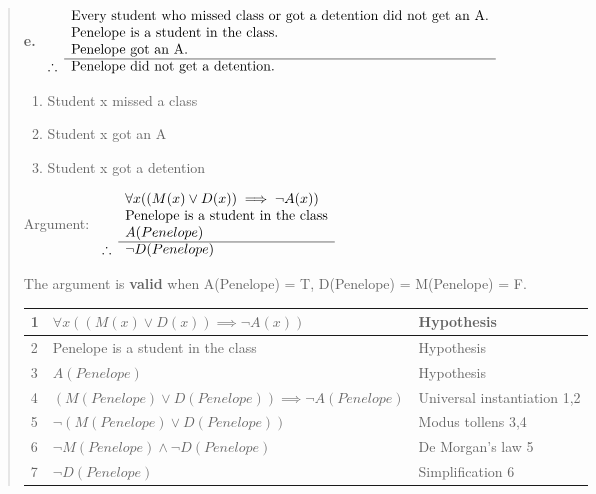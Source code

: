 \documentclass[11pt, oneside]{article}
\begin{document}
\begin{quote}
    \textbf{e. }
    \(
    \begin{array}{rl}
      & \textnormal{Every student who missed class or got a detention did not get an A.} \\
      & \textnormal{Penelope is a student in the class.} \\
      & \textnormal{Penelope got an A.} \\
      \cline{2-2}
    \therefore & \textnormal{Penelope did not get a detention.} 
    \end{array}
    \)  
    
    \begin{enumerate}
        \item[M(x):] Student x missed a class
        \item[A(x):] Student x got an A
        \item[D(x):] Student x got a detention
    \end{enumerate}
    
    Argument:
    \(
    \begin{array}{rl}
      & \forall x ((M(x) \lor D(x)) \implies \neg A(x)) \\
      & \textnormal{Penelope is a student in the class} \\
      & A(Penelope) \\
      \cline{2-2}
    \therefore & \neg D(Penelope) 
    \end{array}
    \)
    
    The argument is \textbf{valid} when A(Penelope) = T, D(Penelope) = M(Penelope) = F.
    
    \begin{tabular}{|p{0.5cm}|p{10cm}|p{4.5cm}|}
        \hline
        1 & $\forall x ((M(x) \lor D(x)) \implies \neg A(x))$ & Hypothesis \\
        \hline
        2 & Penelope is a student in the class & Hypothesis \\
        \hline
        3 & $A(Penelope)$ & Hypothesis \\
        \hline
        4 & $(M(Penelope) \lor D(Penelope)) \implies \neg A(Penelope)$ & Universal instantiation 1,2 \\
        \hline
        5 & $\neg (M(Penelope) \lor D(Penelope))$ & Modus tollens 3,4 \\
        \hline
        6 & $\neg M(Penelope) \land \neg D(Penelope)$ & De Morgan's law 5 \\
        \hline
        7 & $\neg D(Penelope)$ & Simplification 6 \\
        \hline
    \end{tabular}
\end{quote}
\end{document}
